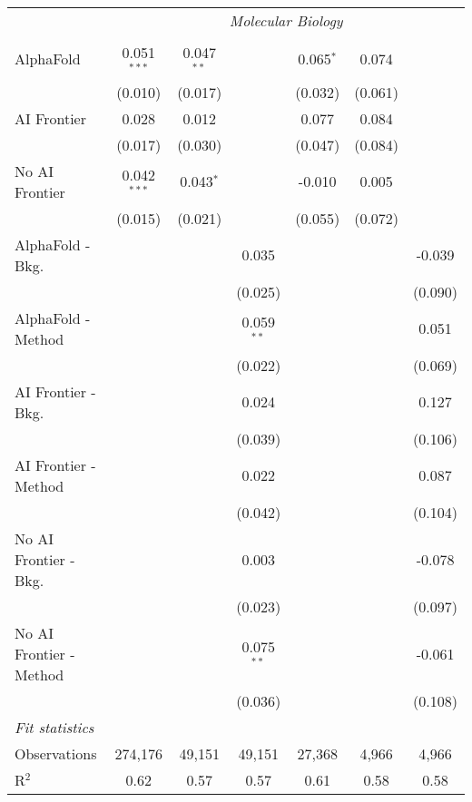\begin{tabular}{lcccccc}
 & \multicolumn{6}{c}{\textit{Molecular Biology}} \\ \\
   AlphaFold               & 0.051$^{***}$ & 0.047$^{**}$ &              & 0.065$^{*}$ & 0.074   &   \\   
                           & (0.010)       & (0.017)      &              & (0.032)     & (0.061) &   \\   
   AI Frontier             & 0.028         & 0.012        &              & 0.077       & 0.084   &   \\   
                           & (0.017)       & (0.030)      &              & (0.047)     & (0.084) &   \\   
   No AI Frontier          & 0.042$^{***}$ & 0.043$^{*}$  &              & -0.010      & 0.005   &   \\   
                           & (0.015)       & (0.021)      &              & (0.055)     & (0.072) &   \\   
   AlphaFold - Bkg.        &               &              & 0.035        &             &         & -0.039\\   
                           &               &              & (0.025)      &             &         & (0.090)\\   
   AlphaFold - Method      &               &              & 0.059$^{**}$ &             &         & 0.051\\   
                           &               &              & (0.022)      &             &         & (0.069)\\   
   AI Frontier - Bkg.      &               &              & 0.024        &             &         & 0.127\\   
                           &               &              & (0.039)      &             &         & (0.106)\\   
   AI Frontier - Method    &               &              & 0.022        &             &         & 0.087\\   
                           &               &              & (0.042)      &             &         & (0.104)\\   
   No AI Frontier - Bkg.   &               &              & 0.003        &             &         & -0.078\\   
                           &               &              & (0.023)      &             &         & (0.097)\\   
   No AI Frontier - Method &               &              & 0.075$^{**}$ &             &         & -0.061\\   
                           &               &              & (0.036)      &             &         & (0.108)\\   
   \midrule
   \emph{Fit statistics}\\
   Observations            & 274,176       & 49,151       & 49,151       & 27,368      & 4,966   & 4,966\\  
   R$^2$                   & 0.62          & 0.57         & 0.57         & 0.61        & 0.58    & 0.58\\  
   

\end{tabular}
